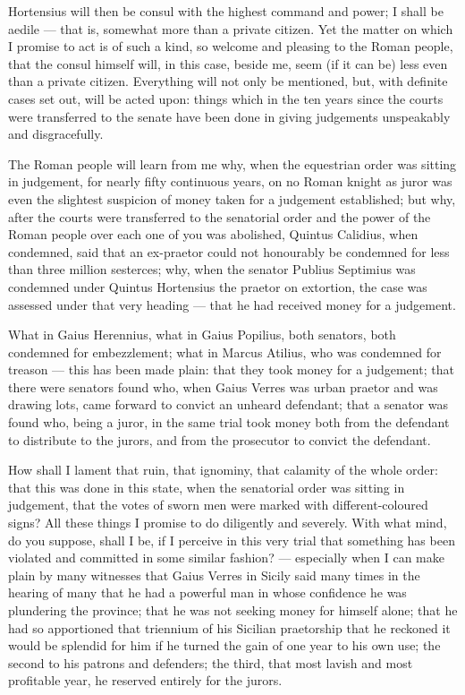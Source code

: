  Hortensius will then be consul with the highest command and power; I shall be aedile --- that is, somewhat more than a private citizen. Yet the matter on which I promise to act is of such a kind, so welcome and pleasing to the Roman people, that the consul himself will, in this case, beside me, seem (if it can be) less even than a private citizen. Everything will not only be mentioned, but, with definite cases set out, will be acted upon: things which in the ten years since the courts were transferred to the senate have been done in giving judgements unspeakably and disgracefully.

 The Roman people will learn from me why, when the equestrian order was sitting in judgement, for nearly fifty continuous years, on no Roman knight as juror was even the slightest suspicion of money taken for a judgement established; but why, after the courts were transferred to the senatorial order and the power of the Roman people over each one of you was abolished, Quintus Calidius, when condemned, said that an ex-praetor could not honourably be condemned for less than three million sesterces; why, when the senator Publius Septimius was condemned under Quintus Hortensius the praetor on extortion, the case was assessed under that very heading --- that he had received money for a judgement.

 What in Gaius Herennius, what in Gaius Popilius, both senators, both condemned for embezzlement; what in Marcus Atilius, who was condemned for treason --- this has been made plain: that they took money for a judgement; that there were senators found who, when Gaius Verres was urban praetor and was drawing lots, came forward to convict an unheard defendant; that a senator was found who, being a juror, in the same trial took money both from the defendant to distribute to the jurors, and from the prosecutor to convict the defendant.

 How shall I lament that ruin, that ignominy, that calamity of the whole order: that this was done in this state, when the senatorial order was sitting in judgement, that the votes of sworn men were marked with different-coloured signs? All these things I promise to do diligently and severely. With what mind, do you suppose, shall I be, if I perceive in this very trial that something has been violated and committed in some similar fashion? --- especially when I can make plain by many witnesses that Gaius Verres in Sicily said many times in the hearing of many that he had a powerful man in whose confidence he was plundering the province; that he was not seeking money for himself alone; that he had so apportioned that triennium of his Sicilian praetorship that he reckoned it would be splendid for him if he turned the gain of one year to his own use; the second to his patrons and defenders; the third, that most lavish and most profitable year, he reserved entirely for the jurors.

